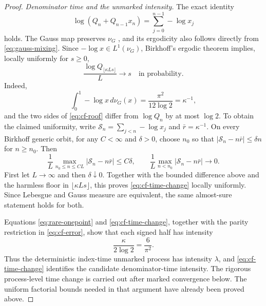 \documentclass[11pt]{article}
\numberwithin{equation}{section}
\theoremstyle{definition}
\newcommand{\1}{\mathbf 1}
\begin{document}
\begin{proof}
\emph{Denominator time and the unmarked intensity.}
The exact identity
\begin{equation}\label{eq:cf-roof}
 \log(Q_n+Q_{n-1}x_n)
 =\sum_{j=0}^{n-1}-\log x_j
\end{equation}
holds.  The Gauss map preserves \(\nu_G\)
\cite[Chapter~III]{Khinchin}, and its ergodicity also follows directly
from \eqref{eq:gauss-mixing}.  Since \(-\log x\in L^1(\nu_G)\),
Birkhoff's ergodic theorem \cite{Birkhoff} implies, locally uniformly
for \(s\ge0\),
\begin{equation}\label{eq:cf-time-change}
 \frac{\log Q_{\lfloor\kappa Ls\rfloor}}L
 \longrightarrow s
 \quad\text{in probability}.
\end{equation}
Indeed,
\[
 \int_0^1-\log x\,d\nu_G(x)=\frac{\pi^2}{12\log2}
 =\kappa^{-1},
\]
and the two sides of \eqref{eq:cf-roof} differ from \(\log Q_n\)
by at most \(\log2\).  To obtain the claimed uniformity, write
\(\mathscr S_n=\sum_{j<n}-\log x_j\) and
\(\bar r=\kappa^{-1}\).  On every Birkhoff
generic orbit, for any \(C<\infty\) and \(\delta>0\), choose \(n_0\)
so that \(|\mathscr S_n-n\bar r|\le\delta n\) for \(n\ge n_0\).  Then
\[
 \frac1L\max_{n_0\le n\le CL}|\mathscr S_n-n\bar r|\le C\delta,
 \qquad
 \frac1L\max_{n<n_0}|\mathscr S_n-n\bar r|\longrightarrow0.
\]
First let \(L\to\infty\) and then \(\delta\downarrow0\).
Together with the bounded difference above and the harmless floor in
\(\lfloor\kappa Ls\rfloor\), this proves
\eqref{eq:cf-time-change} locally uniformly.  Since Lebesgue and Gauss
measure are equivalent, the same almost-sure statement holds for both.

Equations \eqref{eq:rare-onepoint} and \eqref{eq:cf-time-change},
together with the parity restriction in \eqref{eq:cf-error}, show that
each signed half has intensity
\begin{equation}\label{eq:cf-intensity}
 \frac{\kappa}{2\log2}=\frac6{\pi^2}.
\end{equation}
Thus the deterministic index-time unmarked process has intensity
\(\lambda\), and \eqref{eq:cf-time-change} identifies the candidate
denominator-time intensity.  The rigorous process-level time change is
carried out after marked convergence below.  The uniform factorial
bounds needed in that argument have already been proved above.


\end{proof}
\end{document}
